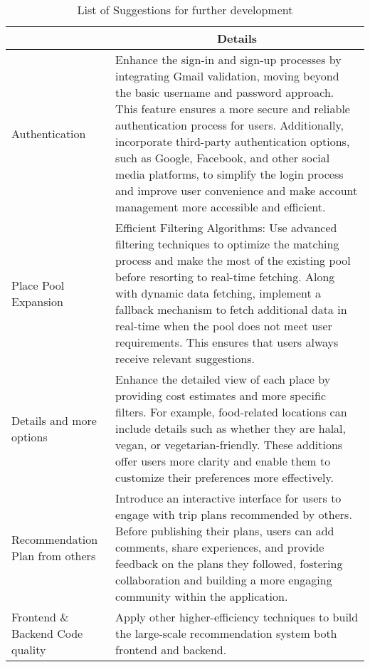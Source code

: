 \newpage
\begin{table}[]
    \centering
    \renewcommand{\arraystretch}{1.2} %
    \begin{tabular}{|p{2.2in}|p{4in}|}
    \hline
    \rowcolor[HTML]{C0C0C0} 
    \multicolumn{1}{|c|}{\cellcolor[HTML]{C0C0C0}\textbf{Suggestion}}                                                                                       & \multicolumn{1}{c|}{\cellcolor[HTML]{C0C0C0}\textbf{Details}}   \\ \hline
    Authentication & Enhance the sign-in and sign-up processes by integrating Gmail validation, moving beyond the basic username and password approach. This feature ensures a more secure and reliable authentication process for users. Additionally, incorporate third-party authentication options, such as Google, Facebook, and other social media platforms, to simplify the login process and improve user convenience and make account management more accessible and efficient. \\ \hline
    Place Pool Expansion & Efficient Filtering Algorithms: Use advanced filtering techniques to optimize the matching process and make the most of the existing pool before resorting to real-time fetching. Along with dynamic data fetching, implement a fallback mechanism to fetch additional data in real-time when the pool does not meet user requirements. This ensures that users always receive relevant suggestions. \\ \hline
    Details and more options & Enhance the detailed view of each place by providing cost estimates and more specific filters. For example, food-related locations can include details such as whether they are halal, vegan, or vegetarian-friendly. These additions offer users more clarity and enable them to customize their preferences more effectively. \\ \hline
    Recommendation Plan from others & Introduce an interactive interface for users to engage with trip plans recommended by others. Before publishing their plans, users can add comments, share experiences, and provide feedback on the plans they followed, fostering collaboration and building a more engaging community within the application. \\ \hline
    Frontend \& Backend Code quality & Apply other higher-efficiency techniques to build the large-scale recommendation system both frontend and backend. \\ \hline
    \end{tabular}
    \caption{List of Suggestions for further development}
    \label{tab:suggestion-table}
\end{table}


